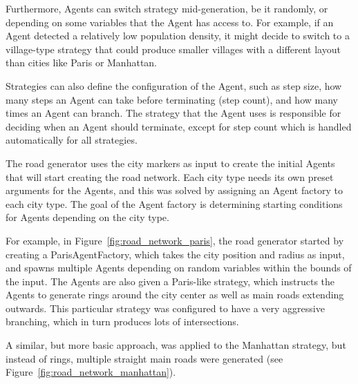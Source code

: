 Furthermore, Agents can switch strategy mid-generation, be it randomly, or depending on some variables that the Agent has access to.
For example, if an Agent detected a relatively low population density, it might decide to switch to a village-type strategy that could produce smaller villages with a different layout than cities like Paris or Manhattan.

Strategies can also define the configuration of the Agent, such as step size, how many steps an Agent can take before terminating (step count), and how many times an Agent can branch.
The strategy that the Agent uses is responsible for deciding when an Agent should terminate, except for step count which is handled automatically for all strategies.

The road generator uses the city markers as input to create the initial Agents that will start creating the road network.
Each city type needs its own preset arguments for the Agents, and this was solved by assigning an Agent factory to each city type.
The goal of the Agent factory is determining starting conditions for Agents depending on the city type.

For example, in Figure~\ref{fig:road_network_paris}, the road generator started by creating a ParisAgentFactory, which takes the city position and radius as input, and spawns multiple Agents depending on random variables within the bounds of the input.
The Agents are also given a Paris-like strategy, which instructs the Agents to generate rings around the city center as well as main roads extending outwards.
This particular strategy was configured to have a very aggressive branching, which in turn produces lots of intersections.

A similar, but more basic approach, was applied to the Manhattan strategy, but instead of rings, multiple straight main roads were generated (see Figure~\ref{fig:road_network_manhattan}).

